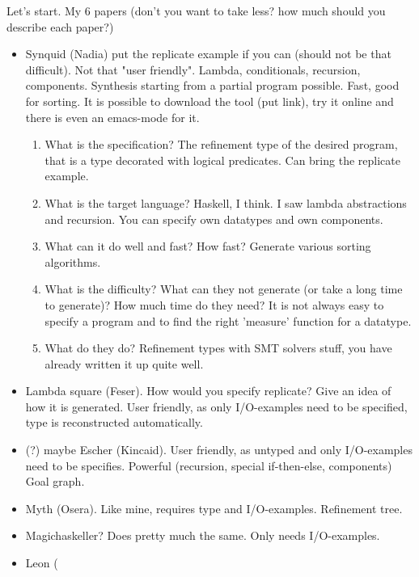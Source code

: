 Let's start. My 6 papers (don't you want to take less? how much should you describe each paper?)
\begin{itemize}
\item Synquid (Nadia) put the replicate example if you can (should not be that difficult). Not that "user friendly". Lambda, conditionals, recursion, components. Synthesis starting from a partial program possible. Fast, good for sorting. It is possible to download the tool (put link), try it online and there is even an emacs-mode for it.
\begin{enumerate}
\item What is the specification?
The refinement type of the desired program, that is a type decorated with logical predicates. Can bring the replicate example.
\item What is the target language?
Haskell, I think. I saw lambda abstractions and recursion. You can specify own datatypes and own components.
\item What can it do well and fast? How fast?
Generate various sorting algorithms.
\item What is the difficulty? What can they not generate (or take a long time to generate)? How much time do they need?
It is not always easy to specify a program and to find the right 'measure' function for a datatype.
\item What do they do?
Refinement types with SMT solvers stuff, you have already written it up quite well.
\end{enumerate}
\item Lambda square (Feser). How would you specify replicate? Give an idea of how it is generated. User friendly, as only I/O-examples need to be specified, type is reconstructed automatically.
\item (?) maybe Escher (Kincaid). User friendly, as untyped and only I/O-examples need to be specifies. Powerful (recursion, special if-then-else, components) Goal graph.
\item Myth (Osera). Like mine, requires type and I/O-examples. Refinement tree.
\item Magichaskeller? Does pretty much the same. Only needs I/O-examples.
\item Leon (
\end{itemize}


